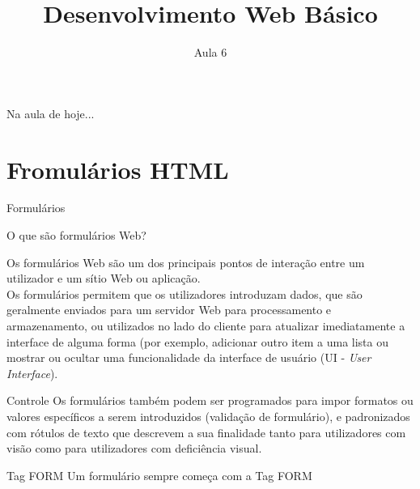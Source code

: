 \documentclass{beamer}
\date{}
\title{Desenvolvimento Web Básico}
\subtitle{Aula 6}
\begin{document}
\frame{
 \titlepage
}

\begin{frame}{Na aula de hoje...} 
\tableofcontents 
\end{frame}

\section{Fromulários HTML}
\begin{frame}{Formulários}
\begin{block}{O que são formulários Web?}
	
Os formulários Web são um dos principais pontos de interação entre um utilizador e um sítio Web ou aplicação. \\
Os formulários permitem que os utilizadores introduzam dados, que são geralmente enviados para um servidor Web para processamento e armazenamento, ou utilizados no lado do cliente para atualizar imediatamente a interface de alguma forma (por exemplo, adicionar outro item a uma lista ou mostrar ou ocultar uma funcionalidade da interface de usuário (UI - \textit{User Interface}).
\end{block}

\end{frame}
\begin{frame}{Controle}
	Os formulários também podem ser programados para impor formatos ou valores específicos a serem introduzidos (validação de formulário), e padronizados com rótulos de texto que descrevem a sua finalidade tanto para utilizadores com visão como para utilizadores com deficiência visual.
\end{frame}
\begin{frame}{Tag FORM}
Um formulário sempre começa com a Tag FORM
\begin{center}
    \begin{lstlisting}[style=htmlcssjs]
    \end{lstlisting}
  \end{center}
\end{frame}
\end{document}
